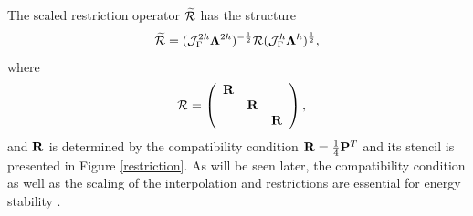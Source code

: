 The scaled restriction operator $\widetilde{\mathcal{R}} $ has the structure 
 \[\widetilde{\mathcal{R}} =  (\mathcal{J}^{2h}_\Gamma \bm{\Lambda}^{2h})^{-\frac{1}{2}}\mathcal{R}(\mathcal{J}^{h}_\Gamma \bm{\Lambda}^h)^{\frac{1}{2}},\]
 where
\begin{align*}
\ \ \mathcal{R} = \left(\begin{array}{ccc}
{\bf R}& ~  & ~ \\
~ & {\bf R} & ~ \\
~ &~  &{\bf R}\end{array}\right),
\end{align*}
and ${\bf R}$ is determined by the compatibility condition ${\bf R}=\frac{1}{4}{\bf P}^T$ and its stencil is presented in Figure \ref{restriction}. As will be seen later, the compatibility condition as well as the scaling of the interpolation and restrictions are essential for energy stability \cite{Lundquist2018}.



